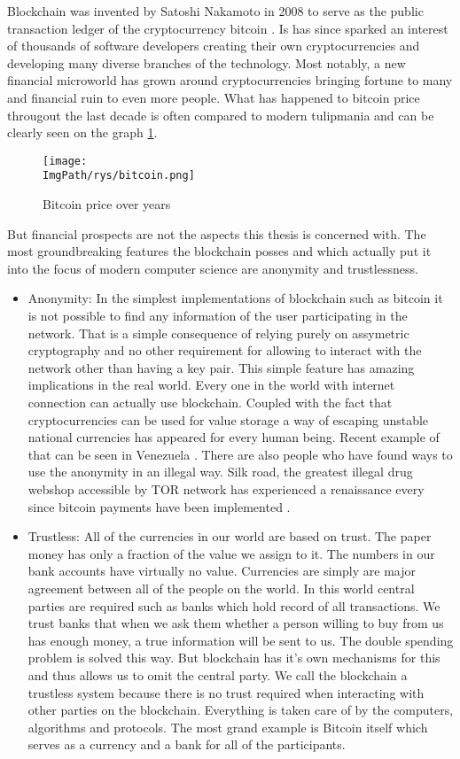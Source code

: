 \documentclass[a4paper,12pt,twoside,openany]{report}
\newcommand{\ImgPath}{.}
\begin{document}
Blockchain was invented by Satoshi Nakamoto in 2008 to serve as the public transaction ledger of the cryptocurrency bitcoin \cite{Bitcoin}.  Is has since sparked an interest of thousands of software developers creating their own cryptocurrencies and developing many diverse branches of the technology. Most notably, a new financial microworld has grown around cryptocurrencies bringing fortune to many and financial ruin to even more people. What has happened to bitcoin price througout the last decade is often compared to modern tulipmania and can be clearly seen on the graph \ref{bitcoin}. 
\begin{figure}[!htbp]
	\begin{center}
\centering
\texttt{[image: \\ImgPath/rys/bitcoin.png]}
\end{center}
	\caption{Bitcoin price over years}
	\label{bitcoin}
\end{figure}

But financial prospects are not the aspects this thesis is concerned with. The most groundbreaking features the blockchain posses and which actually put it into the focus of modern computer science are anonymity and trustlessness.
\begin{itemize}
\item Anonymity: In the simplest implementations of blockchain such as bitcoin it is not possible to find any information of the user participating in the network. That is a simple consequence of relying purely on assymetric cryptography and no other requirement for allowing to interact with the network other than having a key pair. This simple feature has amazing implications in the real world. Every one in the world with internet connection can actually use blockchain. Coupled with the fact that cryptocurrencies can be used for value storage a way of escaping unstable national currencies has appeared for every human being. Recent example of that can be seen in Venezuela \cite{Venezuela}. There are also people who have found ways to use the anonymity in an illegal way. Silk road, the greatest illegal drug webshop accessible by TOR network has experienced a renaissance every since bitcoin payments have been implemented \cite{Silkroad}. 

\item Trustless: All of the currencies in our world are based on trust. The paper money has only a fraction of the value we assign to it. The numbers in our bank accounts have virtually no value. Currencies are simply are major agreement between all of the people on the world. In this world central parties are required such as banks which hold record of all transactions. We trust banks that when we ask them whether a person willing to buy from us has enough money, a true information will be sent to us. The double spending problem is solved this way. But blockchain has it's own mechanisms for this and thus allows us to omit the central party. We call the blockchain a trustless system because there is no trust required when interacting with other parties on the blockchain. Everything is taken care of by the computers, algorithms and protocols. The most grand example is Bitcoin itself which serves as a currency and a bank for all of the participants.
\end{itemize}
\end{document}
